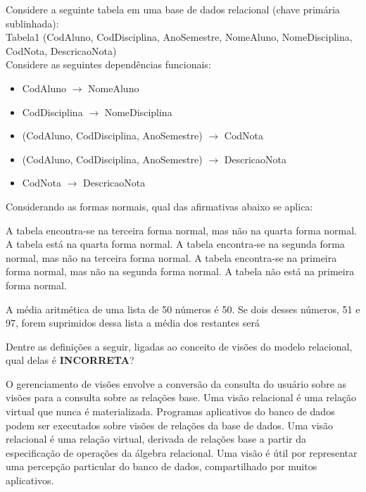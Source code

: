 \documentclass[12pt, addpoints]{exam}
\begin{document}
\begin{questions}
\question
Considere a seguinte tabela em uma base de dados relacional (chave primária sublinhada):\\
Tabela1 (CodAluno, CodDisciplina, AnoSemestre, NomeAluno, NomeDisciplina, CodNota, DescricaoNota)\\
Considere as seguintes dependências funcionais:
\begin{itemize}
    \item CodAluno \(\rightarrow\) NomeAluno
    \item CodDisciplina \(\rightarrow\) NomeDisciplina
    \item (CodAluno, CodDisciplina, AnoSemestre) \(\rightarrow\) CodNota
    \item (CodAluno, CodDisciplina, AnoSemestre) \(\rightarrow\) DescricaoNota
    \item CodNota \(\rightarrow\) DescricaoNota
\end{itemize}

Considerando as formas normais, qual das afirmativas abaixo se aplica:
\begin{choices}
\choice A tabela encontra-se na terceira forma normal, mas não na quarta forma normal.
\choice A tabela está na quarta forma normal.
\choice A tabela encontra-se na segunda forma normal, mas não na terceira forma normal.
\choice A tabela encontra-se na primeira forma normal, mas não na segunda forma normal.
\choice A tabela não está na primeira forma normal.
\end{choices}

\question
A média aritmética de uma lista de 50 números é 50. Se dois desses números, 51 e 97, forem suprimidos dessa lista a média dos restantes será

\begin{choices}
\end{choices}

\question
Dentre as definições a seguir, ligadas ao conceito de visões do modelo relacional, qual delas é \textbf{INCORRETA}?

\begin{choices}
\choice O gerenciamento de visões envolve a conversão da consulta do usuário sobre as visões para a consulta sobre as relações base.
\choice Uma visão relacional é uma relação virtual que nunca é materializada.
\choice Programas aplicativos do banco de dados podem ser executados sobre visões de relações da base de dados.
\choice Uma visão relacional é uma relação virtual, derivada de relações base a partir da especificação de operações da álgebra relacional.
\choice Uma visão é útil por representar uma percepção particular do banco de dados, compartilhado por muitos aplicativos.
\end{choices}



    \end{questions}
    
\end{document}
